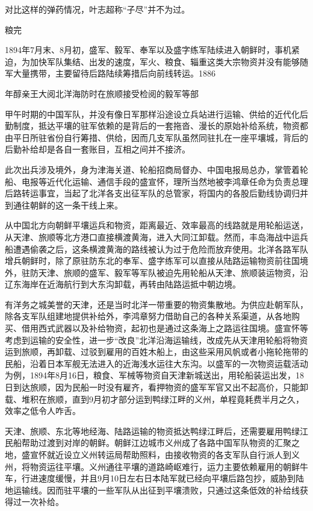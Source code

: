\documentclass[12pt,UTF8]{ctexbook}
\begin{document}
对比这样的弹药情况，叶志超称“子尽”并不为过。

粮完

1894年7月末、8月初，盛军、毅军、奉军以及盛字练军陆续进入朝鲜时，事机紧迫，为加快军队集结、出发的速度，军火、粮食、辎重这类大宗物资并没有能够随军大量携带，主要留待后路陆续筹措后向前线转运。1886


年醇亲王大阅北洋海防时在旅顺接受检阅的毅军等部

甲午时期的中国军队，并没有像日军那样沿途设立兵站进行运输、供给的近代化后勤制度，抵达平壤的驻军依赖的是背后的一套拖沓、漫长的原始补给系统，物资都由平日所驻省份自行筹措、供给，因而几支军队虽然同驻扎在一座平壤城，背后的后勤补给却是各自一套账目，互相之间并不接济。

此次出兵涉及境外，身为津海关道、轮船招商局督办、中国电报局总办，掌管着轮船、电报等近代化运输、通信手段的盛宣怀，理所当然地被李鸿章任命为负责总理后路转运事宜，当起了北洋各支出征军队的总管家，将国内的各股后勤线协调归并到通往朝鲜的这一条干线上来。

从中国北方向朝鲜平壤运兵和物资，距离最近、效率最高的线路就是用轮船运送，从天津、旅顺等北方港口直接横渡黄海，进入大同江卸载。然而，丰岛海战中运兵船遭遇偷袭之后，这条横渡黄海的路线被认为过于危险而放弃使用。北洋各路军队增兵朝鲜时，除了原驻防东北的奉军、盛字练军可以直接从陆路运输物资前往国境外，驻防天津、旅顺的盛军、毅军等军队被迫先用轮船从天津、旅顺装运物资，沿辽东海岸在近海航行到大东沟卸载，再转由陆路运抵中朝边境。

有洋务之城美誉的天津，还是当时北洋一带重要的物资集散地。为供应赴朝军队，除各支军队组建地提供补给外，李鸿章努力借助自己的各种关系渠道，从各地购买、借用西式武器以及补给物资，起初也是通过这条海上之路运往国境。盛宣怀等考虑到运输的安全性，进一步“改良”北洋沿海运输线，改成先从天津用轮船将物资运到旅顺，再卸载、过驳到雇用的百姓木船上，由这些采用风帆或者小拖轮拖带的民船，沿着日本军舰无法进入的近海浅水运往大东沟。以盛军的一次物资运载活动为例，1894年8月16日，粮食、军械等物资自天津新城送出，用轮船装运出发，18日到达旅顺，因为民船一时没有雇齐，看押物资的盛军军官又出不起高价，只能卸载、堆积在旅顺，直到9月初才部分运到鸭绿江畔的义州，单程竟耗费半月之久，效率之低令人咋舌。

天津、旅顺、东北等地经海、陆路运输的物资抵达鸭绿江畔后，还需要雇用鸭绿江民船帮助过渡到对岸的朝鲜。朝鲜江边城市义州成了各路中国军队物资的汇聚之地，盛宣怀就近设立义州转运局帮助照料，由接收物资的各支军队自行派人到义州，将物资运往平壤。义州通往平壤的道路崎岖难行，运力主要依赖雇用的朝鲜牛车，行进速度缓慢，并且9月10日左右日本陆军就已经向平壤后路包抄，威胁到陆地运输线。因而驻平壤的一些军队从出征到平壤溃败，只通过这条低效的补给线获得过一次补给。
\end{document}
